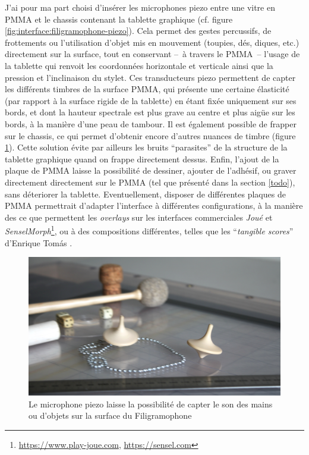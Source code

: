 \indent J'ai pour ma part choisi d'insérer les microphones piezo entre une vitre en \gls{PMMA} et le chassis contenant la tablette graphique (cf. figure \ref{fig:interface:filigramophone-piezo}). Cela permet des gestes percussifs, de frottements ou l'utilisation d'objet mis en mouvement (toupies, dés, diques, etc.) directement sur la surface, tout en conservant --~à travers le \gls{PMMA}~-- l'usage de la tablette qui renvoit les coordonnées horizontale et verticale ainsi que la pression et l'inclinaison du stylet. Ces transducteurs piezo permettent de capter les différents timbres de la surface \gls{PMMA}, qui présente une certaine élasticité (par rapport à la surface rigide de la tablette) en étant fixée uniquement sur ses bords, et dont la hauteur spectrale est plus grave au centre et plus aigüe sur les bords, à la manière d'une peau de tambour. Il est également possible de frapper sur le chassis, ce qui permet d'obtenir encore d'autres nuances de timbre (figure \ref{fig:interface:filigramophone-toupie}). Cette solution évite par ailleurs les bruits ``parasites'' de la structure de la tablette graphique quand on frappe directement dessus. Enfin, l'ajout de la plaque de \gls{PMMA} laisse la possibilité de dessiner, ajouter de l'adhésif, ou graver directement directement sur le \gls{PMMA} (tel que présenté dans la section \ref{todo}), sans déteriorer la tablette. Eventuellement, disposer de différentes plaques de \gls{PMMA} permettrait d'adapter l'interface à différentes configurations, à la manière des ce que permettent les \textit{overlays} sur les interfaces commerciales \textit{Joué} et \textit{SenselMorph}\footnote{\url{https://www.play-joue.com}, \url{https://sensel.com}}, ou à des compositions différentes, telles que les ``\textit{tangible scores}'' d'Enrique Tomás \cite{tomas_tangible_2014}.

\begin{figure}[!htbp]
	\captionsetup{format=plain}%
	\includegraphics[width=\textwidth]{gfx/05_interfaces/filigramophone-toupie.jpg}
	\caption[Captation du son des mains ou d'objets sur la surface du Filigramophone]{Le microphone piezo laisse la possibilité de capter le son des mains ou d'objets sur la surface du Filigramophone}
	\label{fig:interface:filigramophone-toupie}
\end{figure}

